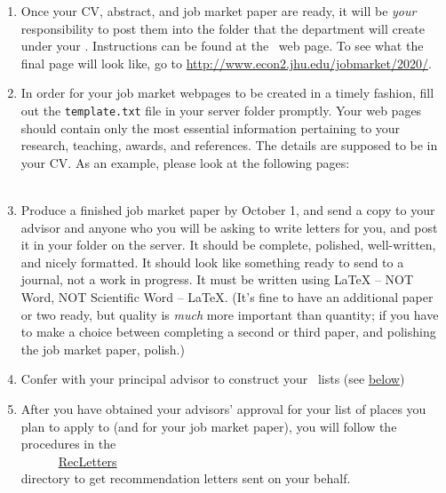 \documentclass{\classes/econtex}
\begin{document}
\begin{enumerate}
  \hypertarget{Post-To-Server}{}
\item Once your CV, abstract, and job market paper are ready, it will
  be \textit{your} responsibility to post them into the folder that
  the department will create under your \Moniker.
  Instructions can be found at the~{\JMPHLink} web page.  To see what
  the final page will look like, go to
  \url{http://www.econ2.jhu.edu/jobmarket/2020/}.
  
  \hypertarget{Template}{}
\item In order for your job market webpages to be created in a timely fashion, 
  fill out the \texttt{template.txt} file in your server folder promptly.
  Your web pages should contain only the most essential information 
  pertaining to your research, teaching, awards, and references. 
  The details are supposed to be in your CV.
  As an example, please look at the following pages:\\
  \\
  

  \hypertarget{Produce-Job-Paper}{}
\item Produce a finished job market paper by October 1, and send a copy to your advisor and anyone who you will be asking to write letters for you, and post it in your folder on the server.  It should be complete, polished, well-written, and nicely formatted.  It should look like something ready to send to a journal, not a work in progress.  It must be written using {\LaTeX} -- NOT Word, NOT Scientific Word -- {\LaTeX}.  (It's fine to have an additional paper or two ready, but quality is \textit{much} more important than quantity; if you have to make a choice between completing a second or third paper, and polishing the job market paper, polish.)
  
  \hypertarget{\EM}{}
\item Confer with your principal advisor to construct your~{\EMtt} lists (see \hyperlink{below}{below})

  
  \hypertarget{Rec-Letters}{}
\item After you have obtained your advisors' approval for your list of
  places you plan to apply to (and for your job market paper), you
  will follow the procedures in the \\
  ~~~~~~\href{\bloburl/RecLetters}{RecLetters} \\
  directory to get recommendation letters sent on your behalf.


\end{enumerate}
\end{document}
